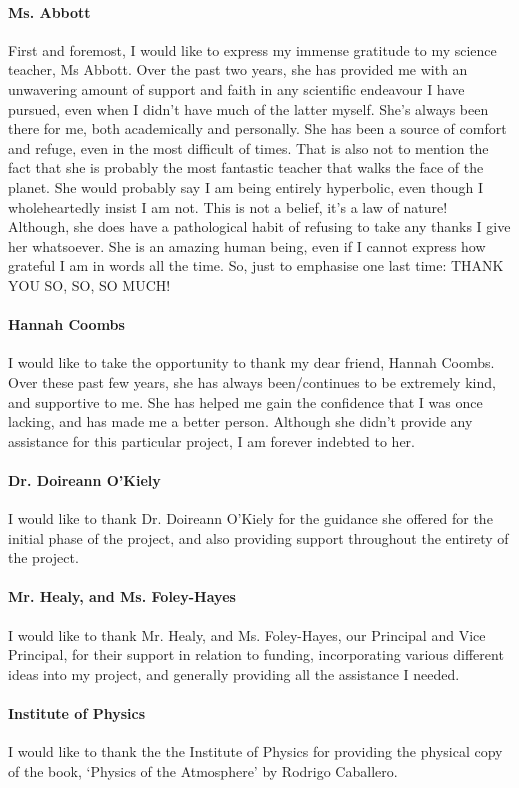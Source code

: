 \paragraph{Ms. Abbott} First and foremost, I would like to express my immense gratitude to my science teacher, Ms Abbott. Over the past two years, she has provided me with an unwavering amount of support and faith in any scientific endeavour I have pursued, even when I didn't have much of the latter myself. She’s always been there for me, both academically and personally. She has been a source of comfort and refuge, even in the most difficult of times. That is also not to mention the fact that she is probably the most fantastic teacher that walks the face of the planet. She would probably say I am being entirely hyperbolic, even though I wholeheartedly insist I am not. This is not a belief, it's a law of nature! Although, she does have a pathological habit of refusing to take any thanks I give her whatsoever. She is an amazing human being, even if I cannot express how grateful I am in words all the time. So, just to emphasise one last time:  THANK YOU SO, SO, SO MUCH!

\paragraph{Hannah Coombs} I would like to take the opportunity to thank my dear friend, Hannah Coombs. Over these past few years, she has always been/continues to be extremely kind, and supportive to me. She has helped me gain the confidence that I was once lacking, and has made me a better person. Although she didn't provide any assistance for this particular project, I am forever indebted to her.

\paragraph{Dr. Doireann O'Kiely} I would like to thank Dr. Doireann O'Kiely for the guidance she offered for the initial phase of the project, and also providing support throughout the entirety of the project.

\paragraph{Mr. Healy, and Ms. Foley-Hayes}
I would like to thank Mr. Healy, and Ms. Foley-Hayes, our Principal and Vice Principal, for their support in relation to funding, incorporating various different ideas into my project, and generally providing all the assistance I needed.

\paragraph{Institute of Physics}
I would like to thank the the Institute of Physics for providing the physical copy of the book, `Physics of the Atmosphere' by Rodrigo Caballero.